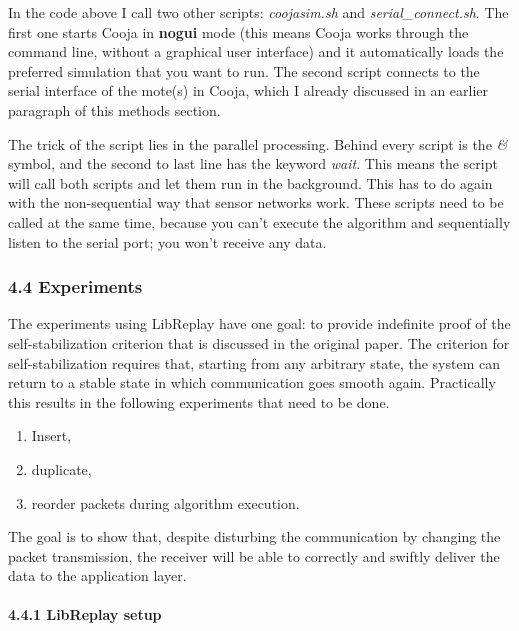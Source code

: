 In the code above I call two other scripts: \emph{coojasim.sh} and
\emph{serial\_connect.sh}. The first one starts Cooja in \textbf{nogui}
mode (this means Cooja works through the command line, without a
graphical user interface) and it automatically loads the preferred
simulation that you want to run. The second script connects to the
serial interface of the mote(s) in Cooja, which I already discussed in
an earlier paragraph of this methods section.

The trick of the script lies in the parallel processing. Behind every
script is the \emph{\&} symbol, and the second to last line has the
keyword \emph{wait}. This means the script will call both scripts and
let them run in the background. This has to do again with the
non-sequential way that sensor networks work. These scripts need to be
called at the same time, because you can't execute the algorithm and
sequentially listen to the serial port; you won't receive any data.

\subsubsection{4.4 Experiments}\label{experiments}

The experiments using LibReplay have one goal: to provide indefinite
proof of the self-stabilization criterion that is discussed in the
original paper. The criterion for self-stabilization requires that,
starting from any arbitrary state, the system can return to a stable
state in which communication goes smooth again. Practically this results
in the following experiments that need to be done.

\begin{enumerate}
\def\labelenumi{\arabic{enumi}.}
\itemsep1pt\parskip0pt
\item
  Insert,
\item
  duplicate,
\item
  reorder packets during algorithm execution.
\end{enumerate}

The goal is to show that, despite disturbing the communication by
changing the packet transmission, the receiver will be able to correctly
and swiftly deliver the data to the application layer.

\paragraph{4.4.1 LibReplay setup\\\\}\label{libreplay-setup}

